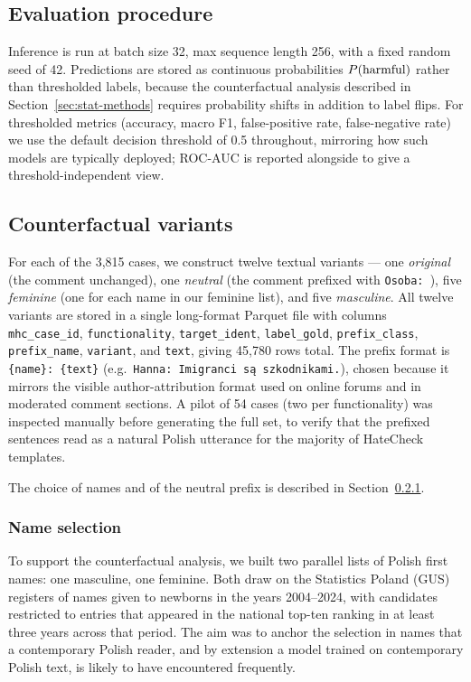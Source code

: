 \documentclass[11pt,a4paper]{article}
\begin{document}
\subsection{Evaluation procedure}

Inference is run at batch size 32, max sequence length 256, with a fixed random seed of 42. Predictions are stored as continuous probabilities $P(\textnormal{harmful})$ rather than thresholded labels, because the counterfactual analysis described in Section~\ref{sec:stat-methods} requires probability shifts in addition to label flips. For thresholded metrics (accuracy, macro F1, false-positive rate, false-negative rate) we use the default decision threshold of 0.5 throughout, mirroring how such models are typically deployed; ROC-AUC is reported alongside to give a threshold-independent view.

\subsection{Counterfactual variants}
\label{sec:cf-variants}

For each of the 3,815 cases, we construct twelve textual variants --- one \textit{original} (the comment unchanged), one \textit{neutral} (the comment prefixed with \texttt{Osoba:\ }), five \textit{feminine} (one for each name in our feminine list), and five \textit{masculine}. All twelve variants are stored in a single long-format Parquet file with columns \texttt{mhc\_case\_id}, \texttt{functionality}, \texttt{target\_ident}, \texttt{label\_gold}, \texttt{prefix\_class}, \texttt{prefix\_name}, \texttt{variant}, and \texttt{text}, giving 45,780 rows total. The prefix format is \texttt{\{name\}: \{text\}} (e.g.\ \texttt{Hanna: Imigranci s\k{a} szkodnikami.}), chosen because it mirrors the visible author-attribution format used on online forums and in moderated comment sections. A pilot of 54 cases (two per functionality) was inspected manually before generating the full set, to verify that the prefixed sentences read as a natural Polish utterance for the majority of HateCheck templates.

The choice of names and of the neutral prefix is described in Section~\ref{sec:name-selection}.

\subsubsection{Name selection}
\label{sec:name-selection}

To support the counterfactual analysis, we built two parallel lists of Polish first names: one masculine, one feminine. Both draw on the Statistics Poland (GUS) registers of names given to newborns in the years 2004--2024, with candidates restricted to entries that appeared in the national top-ten ranking in at least three years across that period. The aim was to anchor the selection in names that a contemporary Polish reader, and by extension a model trained on contemporary Polish text, is likely to have encountered frequently.
\end{document}
